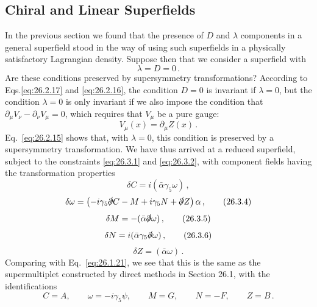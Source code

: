 
\subsection{Chiral and Linear Superfields}

\providecommand{\SuperD}{\mathcal{D}}

In the previous section we found that the presence of $D$ and $\lambda$
components in a general superfield stood in the way of using such superfields
in a physically satisfactory Lagrangian density. Suppose then that we consider
a superfield with
\begin{equation}
  \lambda=D=0\,.
  \tag{26.3.1}\label{eq:26.3.1}
\end{equation}
Are these conditions preserved by supersymmetry transformations? According to
Eqs.\linebreak \eqref{eq:26.2.17} and \eqref{eq:26.2.16}, the condition $D=0$ is
invariant if $\lambda=0$, but the condition $\lambda=0$ is only invariant if
we also impose the condition that
$\partial_\mu V_\nu-\partial_\nu V_\mu=0$, which requires that $V_\mu$ be a
pure gauge:
\begin{equation}
  V_\mu(x)=\partial_\mu Z(x)\,.
  \tag{26.3.2}\label{eq:26.3.2}
\end{equation}
Eq.~\eqref{eq:26.2.15} shows that, with $\lambda=0$, this condition is
preserved by a supersymmetry transformation. We have thus arrived at a reduced
superfield, subject to the constraints \eqref{eq:26.3.1} and
\eqref{eq:26.3.2}, with component fields having the transformation properties
\begin{equation}
  \delta C=i(\bar\alpha\gamma_5\omega)\,,
  \tag{26.3.3}\label{eq:26.3.3}
\end{equation}
\begin{equation}
  \delta\omega=
  \left(-i\gamma_5\sl{\partial}C-M+i\gamma_5N+\sl{\partial}Z\right)\alpha\,,
  \tag{26.3.4}\label{eq:26.3.4}
\end{equation}
\begin{equation}
  \delta M=-(\bar\alpha\sl{\partial}\omega)\,,
  \tag{26.3.5}\label{eq:26.3.5}
\end{equation}
\begin{equation}
  \delta N=i(\bar\alpha\gamma_5\sl{\partial}\omega)\,,
  \tag{26.3.6}\label{eq:26.3.6}
\end{equation}
\begin{equation}
  \delta Z=(\bar\alpha\omega)\,.
  \tag{26.3.7}\label{eq:26.3.7}
\end{equation}
Comparing with Eq.~\eqref{eq:26.1.21}, we see that this is the same as the
supermultiplet constructed by direct methods in Section 26.1, with the
identifications
\begin{equation}
  C=A,\qquad
  \omega=-i\gamma_5\psi,\qquad
  M=G,\qquad
  N=-F,\qquad
  Z=B\,.
  \tag{26.3.8}\label{eq:26.3.8}
\end{equation}


